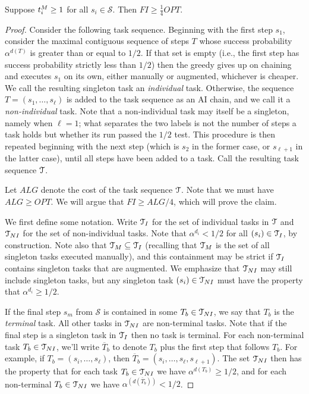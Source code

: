 \begin{lem}
\label{lem:FI.lower.bound.4}
    Suppose $t^{M}_{i} \geq 1$ for all $s_i \in \mathcal{S}$.
    Then $FI \geq \tfrac{1}{4}OPT$.
\end{lem}
\begin{proof}

    Consider the following task sequence.
    Beginning with the first step $s_1$, consider the maximal contiguous sequence of steps $T$ whose success probability $\alpha^{d(T)}$ is greater than or equal to $1/2$.
    If that set is empty (i.e., the first step has success probability strictly less than $1/2$) then the greedy gives up on chaining and executes $s_1$ on its own, either manually or augmented, whichever is cheaper.
    We call the resulting singleton task an \emph{individual} task.
    Otherwise, the sequence $T = (s_1, \dotsc, s_\ell)$ is added to the task sequence as an AI chain, and we call it a \emph{non-individual} task.
    Note that a non-individual task may itself be a singleton, namely when $\ell = 1$; what separates the two labels is not the number of steps a task holds but whether its run passed the $1/2$ test.
    This procedure is then repeated beginning with the next step (which is $s_2$ in the former case, or $s_{\ell+1}$ in the latter case), until all steps have been added to a task.
    Call the resulting task sequence $\mathcal{T}$.

    \medskip

    Let $ALG$ denote the cost of the task sequence $\mathcal{T}$.
    Note that we must have $ALG \geq OPT$.
    We will argue that $FI \geq ALG/4$, which will prove the claim.

    \medskip

    We first define some notation.
    Write $\mathcal{T}_I$ for the set of individual tasks in $\mathcal{T}$ and $\mathcal{T}_{NI}$ for the set of non-individual tasks.
    Note that $\alpha^{d_i} < 1/2$ for all $(s_i) \in \mathcal{T}_I$, by construction.
    Note also that $\mathcal{T}_{M} \subseteq \mathcal{T}_I$ (recalling that $\mathcal{T}_{M}$ is the set of all singleton tasks executed manually), and this containment may be strict if $\mathcal{T}_I$ contains singleton tasks that are augmented.
    We emphasize that $\mathcal{T}_{NI}$ may still include singleton tasks, but any singleton task $(s_i) \in \mathcal{T}_{NI}$ must have the property that $\alpha^{d_i} \geq 1/2$.

    If the final step $s_m$ from $\mathcal{S}$ is contained in some $T_b \in \mathcal{T}_{NI}$, we say that $T_b$ is the \emph{terminal} task.
    All other tasks in $\mathcal{T}_{NI}$ are non-terminal tasks.
Note that if the final step is a singleton task in $\mathcal{T}_I$ then no task is terminal.
    For each non-terminal task $T_b \in \mathcal{T}_{NI}$, we'll write $\overline{T}_b$ to denote $T_b$ plus the first step that follows $T_b$.
    For example, if $T_b = (s_i, \dotsc, s_\ell)$, then $\overline{T}_b = (s_i, \dotsc, s_\ell, s_{\ell+1})$.
    The set $\mathcal{T}_{NI}$ then has the property that for each task $T_b \in \mathcal{T}_{NI}$ we have $\alpha^{d(T_b)} \geq 1/2$, and for each non-terminal $T_b \in \mathcal{T}_{NI}$ we have $\alpha^{(d(\overline{T}_b))} < 1/2$.


\end{proof}
